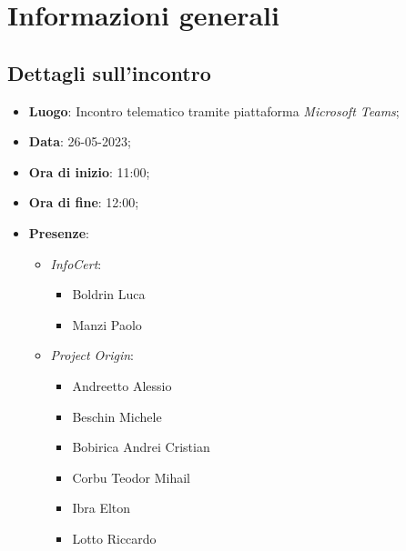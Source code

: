 \section{Informazioni generali}

\subsection{Dettagli sull'incontro}
\begin{itemize}
\item \textbf{Luogo}: Incontro telematico tramite piattaforma \textit{Microsoft Teams\glo};
\item \textbf{Data}: 26-05-2023;
\item \textbf{Ora di inizio}: 11:00;
\item \textbf{Ora di fine}: 12:00;
\item \textbf{Presenze}: 
\begin{itemize}
    \item \textit{InfoCert}: \begin{itemize}
            \item Boldrin Luca 
            \item Manzi Paolo 
        \end{itemize}  
    \item \textit{Project Origin}:  \begin{itemize}
        \item Andreetto Alessio
        \item Beschin Michele
        \item Bobirica Andrei Cristian
        \item Corbu Teodor Mihail
        \item Ibra Elton
        \item Lotto Riccardo 
    \end{itemize}	
\end{itemize}
\end{itemize}



